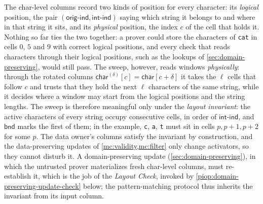 \label{sec:layout-check} The char-level columns record two kinds of position for every character: its \emph{logical} position, the pair $(\mathsf{orig\text{-}ind}, \mathsf{int\text{-}ind})$ saying which string it belongs to and where in that string it sits, and its \emph{physical} position, the index $c$ of the cell that holds it. Nothing so far ties the two together: a prover could store the characters of \texttt{cat} in cells $0$, $5$ and $9$ with correct logical positions, and every check that reads characters through their logical positions, such as the lookups of \cref{sec:domain-preserving}, would still pass. The sweep, however, reads windows \emph{physically}: through the rotated columns $\mathsf{char}^{(\delta)}[c] = \mathsf{char}[c+\delta]$ it takes the $\ell$ cells that follow $c$ and trusts that they hold the next $\ell$ characters of the same string, while it decides where a window may start from the logical positions and the string lengths. The sweep is therefore meaningful only under the \emph{layout invariant}: the active characters of every string occupy consecutive cells, in order of $\mathsf{int\text{-}ind}$, and $\mathsf{bnd}$ marks the first of them; in the example, \texttt{c}, \texttt{a}, \texttt{t} must sit in cells $p, p+1, p+2$ for some $p$. The data owner's columns satisfy the invariant by construction, and the data-preserving updates of \cref{mc:validity,mc:filter} only change activators, so they cannot disturb it. A domain-preserving update (\cref{sec:domain-preserving}), in which the untrusted prover materializes fresh char-level columns, must re-establish it, which is the job of the \emph{Layout Check}, invoked by \cref{piop:domain-preserving-update-check} below; the pattern-matching protocol thus inherits the invariant from its input column.

